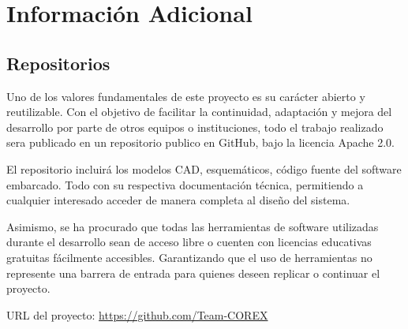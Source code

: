 \chapter{Información Adicional}

\section{Repositorios}

Uno de los valores fundamentales de este proyecto es su carácter abierto y reutilizable.
Con el objetivo de facilitar la continuidad, adaptación y mejora del desarrollo por parte
de otros equipos o instituciones, todo el trabajo realizado sera publicado en un repositorio
publico en GitHub, bajo la licencia Apache 2.0.

El repositorio incluirá los modelos CAD, esquemáticos, código fuente del software
embarcado. Todo con su respectiva documentación técnica, permitiendo a cualquier interesado
acceder de manera completa al diseño del sistema.

Asimismo, se ha procurado que todas las herramientas de software utilizadas durante
el desarrollo sean de acceso libre o cuenten con licencias educativas gratuitas fácilmente
accesibles. Garantizando que el uso de herramientas no represente una barrera de
entrada para quienes deseen replicar o continuar el proyecto.

URL del proyecto: \url{https://github.com/Team-COREX}
